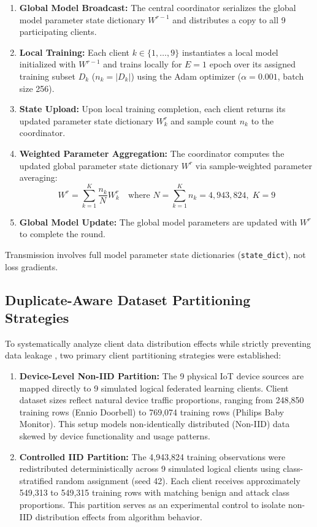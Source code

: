 \documentclass[11pt,a4paper]{article}
\begin{document}
\begin{enumerate}
    \item \textbf{Global Model Broadcast:} The central coordinator serializes the global model parameter state dictionary $W^{r-1}$ and distributes a copy to all 9 participating clients.
    \item \textbf{Local Training:} Each client $k \in \{1, \dots, 9\}$ instantiates a local model initialized with $W^{r-1}$ and trains locally for $E = 1$ epoch over its assigned training subset $D_k$ ($n_k = |D_k|$) using the Adam optimizer ($\alpha = 0.001$, batch size 256).
    \item \textbf{State Upload:} Upon local training completion, each client returns its updated parameter state dictionary $W_k^r$ and sample count $n_k$ to the coordinator.
    \item \textbf{Weighted Parameter Aggregation:} The coordinator computes the updated global parameter state dictionary $W^r$ via sample-weighted parameter averaging:
    \begin{equation}
        W^r = \sum_{k=1}^{K} \frac{n_k}{N} W_k^r \quad \text{where } N = \sum_{k=1}^K n_k = 4,943,824, \; K = 9
    \end{equation}
    \item \textbf{Global Model Update:} The global model parameters are updated with $W^r$ to complete the round.
\end{enumerate}

Transmission involves full model parameter state dictionaries (\texttt{state\_dict}), not loss gradients.

\subsection{Duplicate-Aware Dataset Partitioning Strategies}
To systematically analyze client data distribution effects while strictly preventing data leakage \cite{ref8}, two primary client partitioning strategies were established:

\begin{enumerate}
    \item \textbf{Device-Level Non-IID Partition:} The 9 physical IoT device sources are mapped directly to 9 simulated logical federated learning clients. Client dataset sizes reflect natural device traffic proportions, ranging from 248,850 training rows (Ennio Doorbell) to 769,074 training rows (Philips Baby Monitor). This setup models non-identically distributed (Non-IID) data skewed by device functionality and usage patterns.
    \item \textbf{Controlled IID Partition:} The 4,943,824 training observations were redistributed deterministically across 9 simulated logical clients using class-stratified random assignment (seed 42). Each client receives approximately 549,313 to 549,315 training rows with matching benign and attack class proportions. This partition serves as an experimental control to isolate non-IID distribution effects from algorithm behavior.
\end{enumerate}
\end{document}
